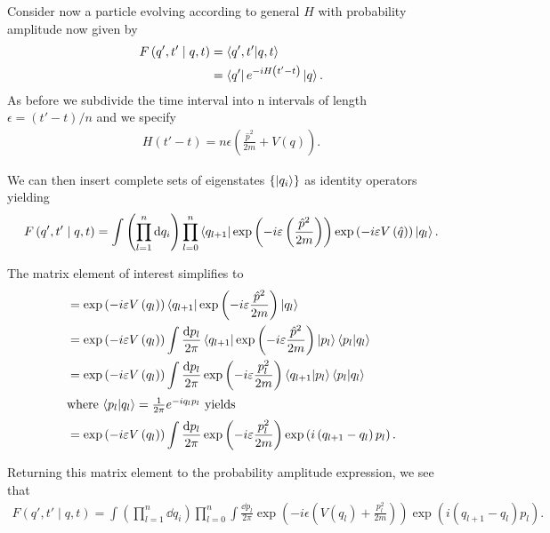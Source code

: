 Consider now a particle evolving according to general $H$ with probability amplitude now given by
\begin{align*}
    F\left( q', t' \mid q, t \right) &= \bra{q', t'} \ket{q, t} \\
    &= \bra{q'} e^{-i H \left( t' - t \right) } \ket{q}
.\end{align*}
As before we subdivide the time interval into n intervals of length $\epsilon = \left( t' -t \right)/n$ and we specify
\begin{align*}
    H\left( t' - t \right) = n\epsilon \left( \frac{\hat{p}^2}{2m} + V\left( q \right)  \right) 
.\end{align*}

We can then insert complete sets of eigenstates $\{\ket{q_{i}}\} $ as identity operators yielding
\begin{align*}
    F\left( q',t'  \mid q,t \right) = \int \left( \prod_{l = 1}^{n} \dd{q_i} \right)  \prod_{l = 0}^{n}  \bra{q_{l+1}}\exp \left( -i\varepsilon \left( \frac{\hat{p}^2}{2m} \right) \right) \exp \left( -i\varepsilon V\left( \hat{q} \right)  \right)  \ket{q_l} 
.\end{align*}

The matrix element of interest simplifies to
\begin{align*}
    &= \exp \left( -i \varepsilon V\left( q_l \right)  \right) \bra{q_{l + 1}} \exp \left( -i \varepsilon \frac{\hat{p}^2}{2m} \right) \ket{q_l}   \\
    &= \exp \left( -i \varepsilon V\left( q_l \right)  \right) \int \frac{\dd{p_l}}{2\pi} \bra{q_{l + 1}} \exp \left( -i \varepsilon \frac{\hat{p}^2}{2m} \right) \ket{p_l} \bra{p_l} \ket{q_l}   \\
    &= \exp \left( -i \varepsilon V\left( q_l \right)  \right) \int \frac{\dd{p_l}}{2\pi}  \exp \left( -i \varepsilon \frac{p_l^2}{2m} \right) \bra{q_{l + 1}}\ket{p_l} \bra{p_l} \ket{q_l}   \\
    \intertext{where $\bra{p_l} \ket{q_l} = \frac{1}{2\pi}e^{-i q_l p_l}$ yields}
    &= \exp \left( -i \varepsilon V\left( q_l \right)  \right) \int \frac{\dd{p_l}}{2\pi}  \exp \left( -i \varepsilon \frac{p_l^2}{2m} \right) \exp \left( i \left( q_{l+1} - q_l \right) p_l \right)
.\end{align*}

Returning this matrix element to the probability amplitude expression, we see that
\begin{align*}
    F\left( q',t'  \mid q,t \right) = \int \left( \prod_{l = 1}^{n} \dd{q_i} \right)  \prod_{l = 0}^{n} \int \frac{\dd{p_l}}{2\pi} \exp \left( -i \epsilon \left( V\left( q_l \right) + \frac{p_l^2}{2m} \right)  \right) \exp \left( i \left( q_{l+1} - q_l \right) p_l \right)
.\end{align*}

